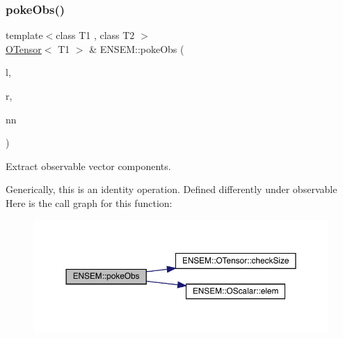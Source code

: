 \subsubsection{\texorpdfstring{pokeObs()}{pokeObs()}}
{\footnotesize\ttfamily template$<$class T1 , class T2 $>$ \\
\mbox{\hyperlink{classENSEM_1_1OTensor}{O\+Tensor}}$<$ T1 $>$ \& E\+N\+S\+E\+M\+::poke\+Obs (\begin{DoxyParamCaption}\item[{\mbox{\hyperlink{classENSEM_1_1OTensor}{O\+Tensor}}$<$ T1 $>$ \&}]{l,  }\item[{const \mbox{\hyperlink{classENSEM_1_1OScalar}{O\+Scalar}}$<$ T2 $>$ \&}]{r,  }\item[{const \mbox{\hyperlink{classXMLArray_1_1Array}{Array}}$<$ int $>$ \&}]{nn }\end{DoxyParamCaption})\hspace{0.3cm}{\ttfamily [inline]}}



Extract observable vector components. 

Generically, this is an identity operation. Defined differently under observable Here is the call graph for this function\+:\nopagebreak
\begin{figure}[H]
\begin{center}
\leavevmode
\includegraphics[width=350pt]{de/d87/group__obstensor_gaa0e4faa1f2d2fe041ebdf6ba05a05178_cgraph}
\end{center}
\end{figure}
\mbox{\label{group__obstensor_ga8cc48d37eeb15654e69ed5549844c124}} 
